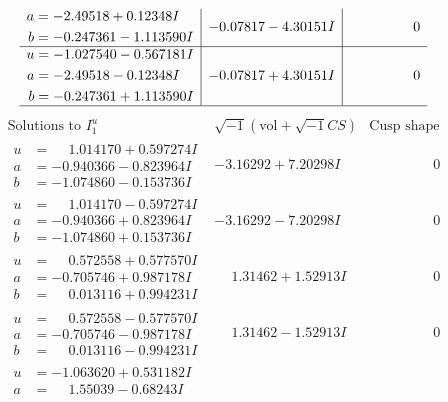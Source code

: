 \documentclass[1p]{elsarticle_modified}
\theoremstyle{definition}
\newcommand{\I}{\sqrt{-1}}
\begin{document}
$$\begin{array}{c|c|c}
\begin{aligned}
a &= -2.49518 + 0.12348 I \\
b &= -0.247361 - 1.113590 I\end{aligned}
 & -0.07817 - 4.30151 I & \phantom{-0.000000 } 0 \\ \hline\begin{aligned}
u &= -1.027540 - 0.567181 I \\
a &= -2.49518 - 0.12348 I \\
b &= -0.247361 + 1.113590 I\end{aligned}
 & -0.07817 + 4.30151 I & \phantom{-0.000000 } 0\\
 \hline 
 \end{array}$$\newpage$$\begin{array}{c|c|c}  
\text{Solutions to }I^u_{1}& \I (\text{vol} + \sqrt{-1}CS) & \text{Cusp shape}\\
 \hline 
\begin{aligned}
u &= \phantom{-}1.014170 + 0.597274 I \\
a &= -0.940366 - 0.823964 I \\
b &= -1.074860 - 0.153736 I\end{aligned}
 & -3.16292 + 7.20298 I & \phantom{-0.000000 } 0 \\ \hline\begin{aligned}
u &= \phantom{-}1.014170 - 0.597274 I \\
a &= -0.940366 + 0.823964 I \\
b &= -1.074860 + 0.153736 I\end{aligned}
 & -3.16292 - 7.20298 I & \phantom{-0.000000 } 0 \\ \hline\begin{aligned}
u &= \phantom{-}0.572558 + 0.577570 I \\
a &= -0.705746 + 0.987178 I \\
b &= \phantom{-}0.013116 + 0.994231 I\end{aligned}
 & \phantom{-}1.31462 + 1.52913 I & \phantom{-0.000000 } 0 \\ \hline\begin{aligned}
u &= \phantom{-}0.572558 - 0.577570 I \\
a &= -0.705746 - 0.987178 I \\
b &= \phantom{-}0.013116 - 0.994231 I\end{aligned}
 & \phantom{-}1.31462 - 1.52913 I & \phantom{-0.000000 } 0 \\ \hline\begin{aligned}
u &= -1.063620 + 0.531182 I \\
a &= \phantom{-}1.55039 - 0.68243 I \\

\end{aligned}
\end{array}$$
\end{document}

